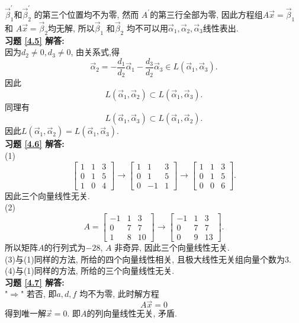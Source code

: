 $\vec{\beta}_1^{'}$和$\vec{\beta}_2^{'}$ 的第三个位置均不为零, 然而 $A^{'}$的第三行全部为零, 因此方程组$A\vec{x}=\vec{\beta}_1$ 和
$A\vec{x}=\vec{\beta}_2$均无解, 所以$\vec{\beta}_1$ 和$\vec{\beta}_2$ 均不可以用$\vec{\alpha}_1, \vec{\alpha}_2, \vec{\alpha}_3$线性表出.\\
\textbf{习题 \ref{4.5} 解答:}\\
因为$d_2\not=0, d_3\not =0$, 由关系式,得$$\vec{\alpha}_2=-\frac{d_1}{d_2}\vec{\alpha}_1-\frac{d_3}{d_2}\vec{\alpha}_3\in L(\vec{\alpha}_1,\vec{\alpha}_3).$$ 因此$$L(\vec{\alpha}_1,\vec{\alpha}_2)\subset L(\vec{\alpha}_1,\vec{\alpha}_3).$$
同理有$$L(\vec{\alpha}_1,\vec{\alpha}_3)\subset L(\vec{\alpha}_1,\vec{\alpha}_2).$$ 因此$L(\vec{\alpha}_1,\vec{\alpha}_2)=L(\vec{\alpha}_1,\vec{\alpha}_3)$.\\
\textbf{习题 \ref{4.6} 解答:}\\
(1)$$\begin{bmatrix}1&1&3\\0&1&5\\1&0&4\end{bmatrix}\longrightarrow \begin{bmatrix}1&1&3\\0&1&5\\0&-1&1\end{bmatrix} \longrightarrow \begin{bmatrix}1&1&3\\0&1&5\\0&0&6\end{bmatrix} .$$ 因此三个向量线性无关.\\
(2)$$A=\begin{bmatrix}-1&1&3\\0&7&7\\1&8&10\end{bmatrix}\longrightarrow \begin{bmatrix}-1&1&3\\0&7&7\\0&9&13\end{bmatrix}.$$ 所以矩阵$A$的行列式为$-28$, $A$ 非奇异, 因此三个向量线性无关.\\
(3)与(1)同样的方法, 所给的四个向量线性相关, 且极大线性无关组向量个数为3.\\
(4)与(1)同样的方法, 所给的三个向量线性无关.\\
\textbf{习题 \ref{4.7} 解答:}\\
"$\Rightarrow$" 若否, 即$a,d,f$ 均不为零, 此时解方程$$A\vec{x}=0$$ 得到唯一解$\vec{x}=0$. 即$A$的列向量线性无关, 矛盾.\\
